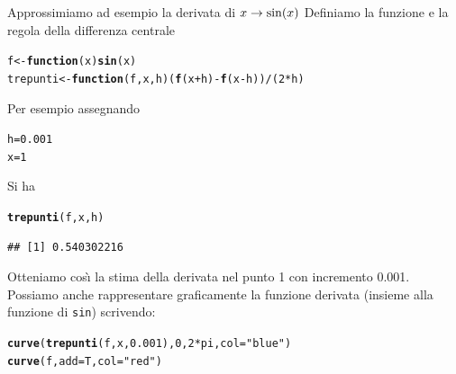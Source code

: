 \documentclass[onecolumn,11pt]{book}\usepackage[]{graphicx}\usepackage[]{color}
\makeatletter
\newcommand{\hlnum}[1]{\textcolor[rgb]{0.686,0.059,0.569}{#1}}%
\newcommand{\hlstr}[1]{\textcolor[rgb]{0.192,0.494,0.8}{#1}}%
\newcommand{\hlopt}[1]{\textcolor[rgb]{0,0,0}{#1}}%
\newcommand{\hlstd}[1]{\textcolor[rgb]{0.345,0.345,0.345}{#1}}%
\newcommand{\hlkwa}[1]{\textcolor[rgb]{0.161,0.373,0.58}{\textbf{#1}}}%
\newcommand{\hlkwb}[1]{\textcolor[rgb]{0.69,0.353,0.396}{#1}}%
\newcommand{\hlkwc}[1]{\textcolor[rgb]{0.333,0.667,0.333}{#1}}%
\newcommand{\hlkwd}[1]{\textcolor[rgb]{0.737,0.353,0.396}{\textbf{#1}}}%
\newenvironment{kframe}{%
 \def\at@end@of@kframe{}%
 \ifinner\ifhmode%
  \def\at@end@of@kframe{\end{minipage}}%
  \begin{minipage}{\columnwidth}%
 \fi\fi%
 \def\FrameCommand##1{\hskip\@totalleftmargin \hskip-\fboxsep
 \colorbox{shadecolor}{##1}\hskip-\fboxsep
     \hskip-\linewidth \hskip-\@totalleftmargin \hskip\columnwidth}%
 \MakeFramed {\advance\hsize-\width
   \@totalleftmargin\z@ \linewidth\hsize
   \@setminipage}}%
 {\par\unskip\endMakeFramed%
 \at@end@of@kframe}
\newenvironment{knitrout}{}{} %
\makeatother
\begin{document}
Approssimiamo ad esempio la derivata di $x\rightarrow {\rm sin}(x)$
Definiamo la funzione e la regola della differenza centrale
\begin{knitrout}
\color{fgcolor}\begin{kframe}
\begin{alltt}
\hlstd{f}\hlkwb{<-}\hlkwa{function}\hlstd{(}\hlkwc{x}\hlstd{)} \hlkwd{sin}\hlstd{(x)}
\hlstd{trepunti}\hlkwb{<-}\hlkwa{function}\hlstd{(}\hlkwc{f}\hlstd{,}\hlkwc{x}\hlstd{,}\hlkwc{h}\hlstd{) (}\hlkwd{f}\hlstd{(x}\hlopt{+}\hlstd{h)}\hlopt{-}\hlkwd{f}\hlstd{(x}\hlopt{-}\hlstd{h))}\hlopt{/}\hlstd{(}\hlnum{2}\hlopt{*}\hlstd{h)}
\end{alltt}
\end{kframe}
\end{knitrout}
Per esempio assegnando
\begin{knitrout}
\color{fgcolor}\begin{kframe}
\begin{alltt}
\hlstd{h}\hlkwb{=}\hlnum{0.001}
\hlstd{x}\hlkwb{=}\hlnum{1}
\end{alltt}
\end{kframe}
\end{knitrout}
Si ha
\begin{knitrout}
\color{fgcolor}\begin{kframe}
\begin{alltt}
\hlkwd{trepunti}\hlstd{(f,x,h)}
\end{alltt}
\begin{verbatim}
## [1] 0.540302216
\end{verbatim}
\end{kframe}
\end{knitrout}
Otteniamo cos\`\i\; la stima della derivata nel punto 1 con incremento 0.001.
Possiamo anche rappresentare graficamente la funzione derivata (insieme alla funzione di \texttt{sin}) scrivendo:
\begin{knitrout}
\color{fgcolor}\begin{kframe}
\begin{alltt}
\hlkwd{curve}\hlstd{(}\hlkwd{trepunti}\hlstd{(f,x,}\hlnum{0.001}\hlstd{),}\hlnum{0}\hlstd{,}\hlnum{2}\hlopt{*}\hlstd{pi,}\hlkwc{col}\hlstd{=}\hlstr{"blue"}\hlstd{)}
\hlkwd{curve}\hlstd{(f,}\hlkwc{add}\hlstd{=T,}\hlkwc{col}\hlstd{=}\hlstr{"red"}\hlstd{)}
\end{alltt}
\end{kframe}
\end{knitrout}
\end{document}
